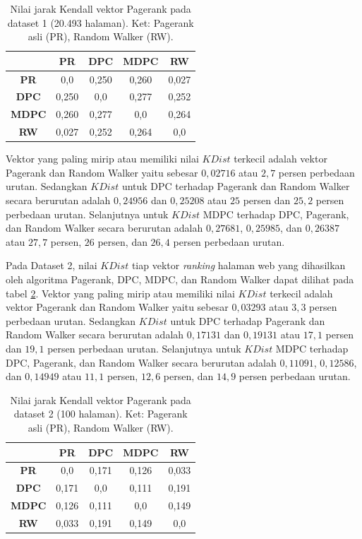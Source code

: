\documentclass[
	a4paper, %
	12pt, %
	unnumberedsections, %
	twoside, %
]{LTJournalArticle}
\begin{document}
\begin{table}
	\caption{Nilai jarak Kendall vektor Pagerank pada dataset 1 (20.493 halaman). Ket: Pagerank asli (PR), Random Walker (RW).}
	\label{table:kendall_distance_score_dataset_1}
	\begin{tabular}{|c|c|c|c|c|}
		\hline
		& \textbf{PR} & \textbf{DPC} & \textbf{MDPC} & \textbf{RW} \\
		\hline
		\textbf{PR} & 0,0 & 0,250 & 0,260 & 0,027 \\
		\hline
		\textbf{DPC} & 0,250 & 0,0 & 0,277 & 0,252 \\
		\hline
		\textbf{MDPC} & 0,260 & 0,277 & 0,0 & 0,264 \\
		\hline
		\textbf{RW} & 0,027 & 0,252 & 0,264 & 0,0 \\
		\hline
	\end{tabular}
\end{table}

Vektor yang paling mirip atau memiliki nilai $KDist$ terkecil adalah vektor Pagerank dan Random Walker yaitu sebesar $0,02716$ atau $2,7$ persen perbedaan urutan. Sedangkan $KDist$ untuk DPC terhadap Pagerank dan Random Walker secara berurutan adalah $0,24956$ dan $0,25208$ atau $25$ persen dan $25,2$ persen perbedaan urutan. Selanjutnya untuk $KDist$ MDPC terhadap DPC, Pagerank, dan Random Walker secara berurutan adalah $0,27681$, $0,25985$, dan $0,26387$ atau $27,7$ persen, $26$ persen, dan $26,4$ persen perbedaan urutan.

Pada Dataset 2, nilai $KDist$ tiap vektor \textit{ranking} halaman web yang dihasilkan oleh algoritma Pagerank, DPC, MDPC, dan Random Walker dapat dilihat pada tabel \ref{table:kendall_distance_score_dataset_2}. Vektor yang paling mirip atau memiliki nilai $KDist$ terkecil adalah vektor Pagerank dan Random Walker yaitu sebesar $0,03293$ atau $3,3$ persen perbedaan urutan. Sedangkan $KDist$ untuk DPC terhadap Pagerank dan Random Walker secara berurutan adalah $0,17131$ dan $0,19131$ atau $17,1$ persen dan $19,1$ persen perbedaan urutan. Selanjutnya untuk $KDist$ MDPC terhadap DPC, Pagerank, dan Random Walker secara berurutan adalah $0,11091$, $0,12586$, dan $0,14949$ atau $11,1$ persen, $12,6$ persen, dan $14,9$ persen perbedaan urutan.

\begin{table}
	\caption{Nilai jarak Kendall vektor Pagerank pada dataset 2 (100 halaman). Ket: Pagerank asli (PR), Random Walker (RW).}
	\label{table:kendall_distance_score_dataset_2}
	\begin{tabular}{|c|c|c|c|c|}
		\hline
		& \textbf{PR} & \textbf{DPC} & \textbf{MDPC} & \textbf{RW} \\
		\hline
		\textbf{PR} & 0,0 & 0,171 & 0,126 & 0,033 \\
		\hline
		\textbf{DPC} & 0,171 & 0,0 & 0,111 & 0,191 \\
		\hline
		\textbf{MDPC} & 0,126 & 0,111 & 0,0 & 0,149 \\
		\hline
		\textbf{RW} & 0,033 & 0,191 & 0,149 & 0,0 \\
		\hline
	\end{tabular}
\end{table}
\end{document}
